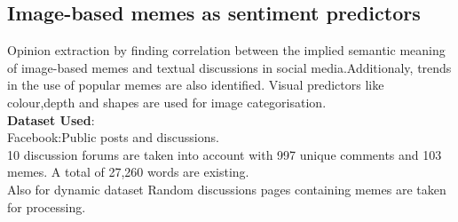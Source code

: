 \documentclass[12pt,a4paper]{article}
\begin{document}
\subsection{Image-based memes as sentiment predictors\cite{imageSentimentPred}}
Opinion extraction by finding correlation between the implied semantic meaning of image-based memes and textual discussions in social media.Additionaly, trends in the use of popular memes are also identified. 
Visual predictors like colour,depth and shapes are used for image categorisation.\\
\textbf{Dataset Used}:\\
Facebook:Public posts and discussions.\\
10 discussion forums are taken into account with 997 unique
comments and 103 memes. A total of 27,260 words are existing.\\
Also for dynamic dataset Random discussions pages containing
memes are taken for processing.\\~\\
\newpage
\end{document}

